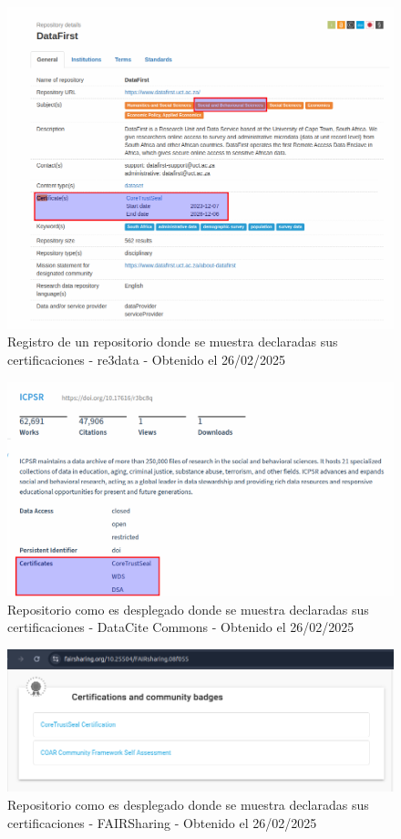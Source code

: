 \documentclass[runningheads]{llncs}
\begin{document}
\begin{figure}
    \centering
    \includegraphics[width=0.5\linewidth]{img/re3data_certified_repo.png}
    \caption{Registro de un repositorio donde se muestra declaradas sus certificaciones - re3data - Obtenido el 26/02/2025}
    \label{fig:re3data_certified_repo}
\end{figure}

\begin{figure}
    \centering
    \includegraphics[width=0.5\linewidth]{img/datacite_certified_repo.png}
    \caption{Repositorio como es desplegado donde se muestra declaradas sus certificaciones - DataCite Commons - Obtenido el 26/02/2025}
    \label{fig:datacite_certified_repo}
\end{figure}

\begin{figure}
    \centering
    \includegraphics[width=0.5\linewidth]{img/fairsharing_certified_repo.png}
    \caption{Repositorio como es desplegado donde se muestra declaradas sus certificaciones - FAIRSharing - Obtenido el 26/02/2025}
    \label{fig:fairsharing_certified_repo}
\end{figure}
\end{document}
